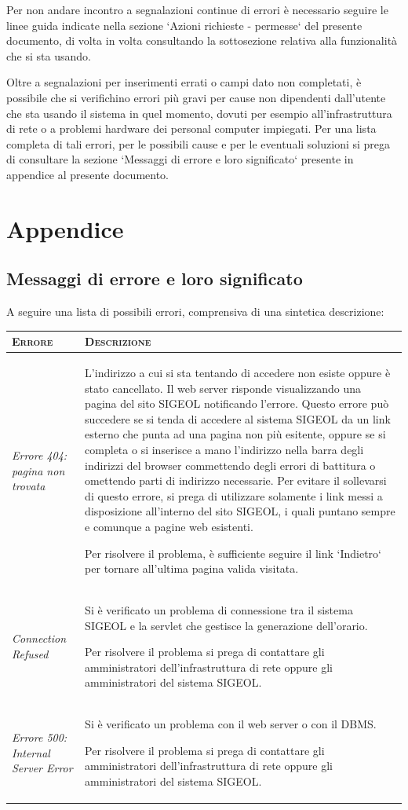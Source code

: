 \documentclass[11pt,a4paper]{article}
\begin{document}
Per non andare incontro a segnalazioni continue di errori è necessario seguire le linee guida indicate nella sezione `Azioni richieste - permesse` del presente documento, di volta in volta consultando la sottosezione relativa alla funzionalità che si sta usando.

Oltre a segnalazioni per inserimenti errati o campi dato non completati, è possibile che si verifichino errori più gravi per cause non dipendenti dall'utente che sta usando il sistema in quel momento, dovuti per esempio all'infrastruttura di rete o a problemi hardware dei personal computer impiegati.
Per una lista completa di tali errori, per le possibili cause e per le eventuali soluzioni si prega di consultare la sezione `Messaggi di errore e loro significato` presente in appendice al presente documento.
\newpage
\section{Appendice}
\subsection{Messaggi di errore e loro significato}
A seguire una lista di possibili errori, comprensiva di una sintetica descrizione:
\begin{center}
\begin{tabular}{|p{}|p{}|}
\hline
\textsc{Errore} & \textsc{Descrizione} \\
\hline
\hline
\textit{Errore 404: pagina non trovata} & L'indirizzo a cui si sta tentando di accedere non esiste oppure è stato cancellato. Il web server 
	risponde visualizzando una pagina del sito SIGEOL notificando l'errore. Questo errore può succedere se si tenda di accedere al sistema
	SIGEOL da un link esterno che punta ad una pagina non più esitente, oppure se si completa o si inserisce a mano l'indirizzo 
	nella barra degli indirizzi del browser commettendo degli errori di battitura o omettendo parti di indirizzo necessarie. Per
	evitare il sollevarsi di questo errore, si prega di utilizzare solamente i link messi a disposizione all'interno del sito SIGEOL, i quali
	puntano sempre e comunque a pagine web esistenti. 

	Per risolvere il problema, è sufficiente seguire il link `Indietro` per tornare all'ultima pagina valida visitata. \\
\hline
\textit{Connection Refused} & Si è verificato un problema di connessione tra il sistema SIGEOL e la servlet che gestisce la generazione dell'orario.

	Per risolvere il problema si prega di contattare gli amministratori dell'infrastruttura di rete oppure gli amministratori del sistema SIGEOL. \\
\hline
\textit{Errore 500: Internal Server Error} & Si è verificato un problema con il web server o con il DBMS. 

Per risolvere il problema si prega di contattare gli amministratori dell'infrastruttura di rete oppure gli amministratori del sistema SIGEOL. \\
\hline
\end{tabular}
\end{center}
\end{document}
